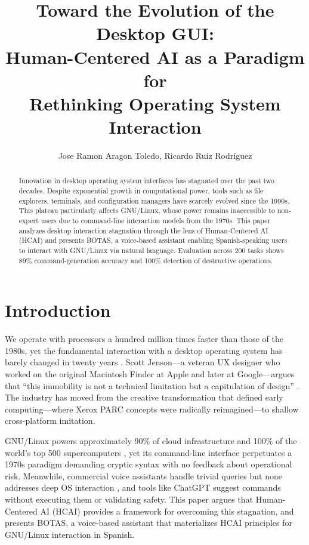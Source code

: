 \documentclass[12pt]{article}
\title{Toward the Evolution of the Desktop GUI:\\ Human-Centered AI as a Paradigm for\\ Rethinking Operating System Interaction}
\author{Jose Ramon Aragon Toledo\inst{1}, Ricardo Ruíz Rodríguez\inst{1}}
\begin{document}
\maketitle

\begin{abstract}
Innovation in desktop operating system interfaces has stagnated over the past two
decades. Despite exponential growth in computational power, tools such as file
explorers, terminals, and configuration managers have scarcely evolved since the
1990s. This plateau particularly affects GNU/Linux, whose power remains inaccessible
to non-expert users due to command-line interaction models from the 1970s. This paper
analyzes desktop interaction stagnation through the lens of Human-Centered AI (HCAI)
and presents BOTAS, a voice-based assistant enabling Spanish-speaking users to
interact with GNU/Linux via natural language. Evaluation across 200 tasks shows
89\% command-generation accuracy and 100\% detection of destructive operations.
\end{abstract}


\section{Introduction}
\label{sec:intro}

We operate with processors a hundred million times faster than those of the 1980s,
yet the fundamental interaction with a desktop operating system has barely changed
in twenty years \cite{Jenson2024}. Scott Jenson---a veteran UX designer who worked
on the original Macintosh Finder at Apple and later at Google---argues that ``this
immobility is not a technical limitation but a capitulation of design''
\cite{Jenson2024}. The industry has moved from the creative transformation that
defined early computing---where Xerox PARC concepts were radically reimagined---to
shallow cross-platform imitation.

GNU/Linux powers approximately 90\% of cloud infrastructure and 100\% of the
world's top 500 supercomputers \cite{W3Techs2023, Top5002023}, yet its command-line
interface perpetuates a 1970s paradigm \cite{Raymond2003} demanding cryptic syntax
with no feedback about operational risk. Meanwhile, commercial voice
assistants handle trivial queries but none addresses deep OS interaction
\cite{Luger2016}, and tools like ChatGPT suggest commands without executing them
or validating safety. This paper argues that Human-Centered AI (HCAI)
\cite{Shneiderman2020, Shneiderman2022} provides a framework for overcoming this
stagnation, and presents BOTAS, a voice-based assistant that materializes HCAI
principles for GNU/Linux interaction in Spanish.
\end{document}
